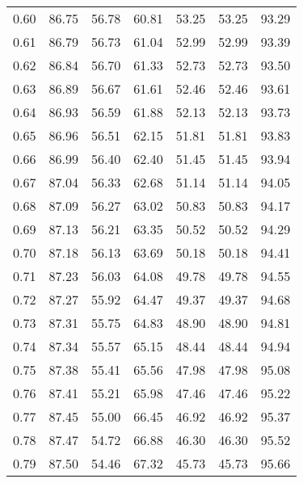 \begin{tabular}{|c|c|c|c|c|c|c|}
      0.60 &     86.75 &     56.78 &      60.81 &   53.25 &      53.25 &         93.29 \\
      0.61 &     86.79 &     56.73 &      61.04 &   52.99 &      52.99 &         93.39 \\
      0.62 &     86.84 &     56.70 &      61.33 &   52.73 &      52.73 &         93.50 \\
      0.63 &     86.89 &     56.67 &      61.61 &   52.46 &      52.46 &         93.61 \\
      0.64 &     86.93 &     56.59 &      61.88 &   52.13 &      52.13 &         93.73 \\
      0.65 &     86.96 &     56.51 &      62.15 &   51.81 &      51.81 &         93.83 \\
      0.66 &     86.99 &     56.40 &      62.40 &   51.45 &      51.45 &         93.94 \\
      0.67 &     87.04 &     56.33 &      62.68 &   51.14 &      51.14 &         94.05 \\
      0.68 &     87.09 &     56.27 &      63.02 &   50.83 &      50.83 &         94.17 \\
      0.69 &     87.13 &     56.21 &      63.35 &   50.52 &      50.52 &         94.29 \\
      0.70 &     87.18 &     56.13 &      63.69 &   50.18 &      50.18 &         94.41 \\
      0.71 &     87.23 &     56.03 &      64.08 &   49.78 &      49.78 &         94.55 \\
      0.72 &     87.27 &     55.92 &      64.47 &   49.37 &      49.37 &         94.68 \\
      0.73 &     87.31 &     55.75 &      64.83 &   48.90 &      48.90 &         94.81 \\
      0.74 &     87.34 &     55.57 &      65.15 &   48.44 &      48.44 &         94.94 \\
      0.75 &     87.38 &     55.41 &      65.56 &   47.98 &      47.98 &         95.08 \\
      0.76 &     87.41 &     55.21 &      65.98 &   47.46 &      47.46 &         95.22 \\
      0.77 &     87.45 &     55.00 &      66.45 &   46.92 &      46.92 &         95.37 \\
      0.78 &     87.47 &     54.72 &      66.88 &   46.30 &      46.30 &         95.52 \\
      0.79 &     87.50 &     54.46 &      67.32 &   45.73 &      45.73 &         95.66 \\

\end{tabular}
